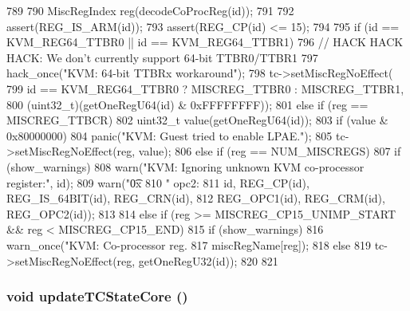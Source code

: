 \begin{DoxyCode}
789 {
790     MiscRegIndex reg(decodeCoProcReg(id));
791 
792     assert(REG_IS_ARM(id));
793     assert(REG_CP(id) <= 15);
794 
795     if (id == KVM_REG64_TTBR0 || id == KVM_REG64_TTBR1) {
796         // HACK HACK HACK: We don't currently support 64-bit TTBR0/TTBR1
797         hack_once("KVM: 64-bit TTBRx workaround\n");
798         tc->setMiscRegNoEffect(
799             id == KVM_REG64_TTBR0 ? MISCREG_TTBR0 : MISCREG_TTBR1,
800             (uint32_t)(getOneRegU64(id) & 0xFFFFFFFF));
801     } else if (reg == MISCREG_TTBCR) {
802         uint32_t value(getOneRegU64(id));
803         if (value & 0x80000000)
804             panic("KVM: Guest tried to enable LPAE.\n");
805         tc->setMiscRegNoEffect(reg, value);
806     } else if (reg == NUM_MISCREGS) {
807         if (show_warnings) {
808             warn("KVM: Ignoring unknown KVM co-processor register:\n", id);
809             warn("\t0x%
810                  " opc2: %
811                  id, REG_CP(id), REG_IS_64BIT(id), REG_CRN(id),
812                  REG_OPC1(id), REG_CRM(id), REG_OPC2(id));
813         }
814     } else if (reg >= MISCREG_CP15_UNIMP_START && reg < MISCREG_CP15_END) {
815         if (show_warnings)
816             warn_once("KVM: Co-processor reg. %
817                       miscRegName[reg]);
818     } else {
819         tc->setMiscRegNoEffect(reg, getOneRegU32(id));
820     }
821 }
\end{DoxyCode}
\hypertarget{classArmKvmCPU_a72bbd13b32502607c6297268cace4868}{
\subsubsection[{updateTCStateCore}]{\setlength{\rightskip}{0pt plus 5cm}void updateTCStateCore ()}}
\label{classArmKvmCPU_a72bbd13b32502607c6297268cace4868}



